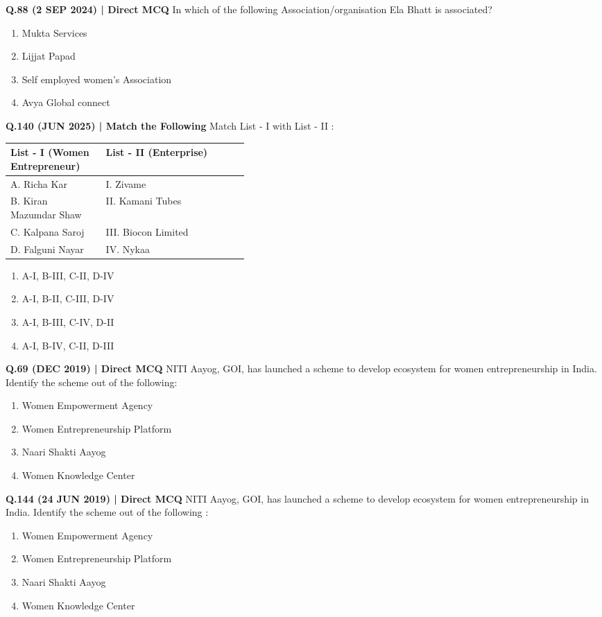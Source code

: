 \documentclass{article}
\begin{document}
\textbf{Q.88 (2 SEP 2024) | Direct MCQ}
In which of the following Association/organisation Ela Bhatt is associated?
\begin{enumerate}[label=(\arabic*)]
    \item Mukta Services
    \item Lijjat Papad
    \item Self employed women's Association
    \item Avya Global connect
\end{enumerate}

\textbf{Q.140 (JUN 2025) | Match the Following}
Match List - I with List - II :
\begin{tabularx}{\linewidth}{@{} p{0.4\linewidth} X @{}}
    \toprule
    \textbf{List - I (Women Entrepreneur)} & \textbf{List - II (Enterprise)} \\
    \midrule
    A. Richa Kar & I. Zivame \\
    B. Kiran Mazumdar Shaw & II. Kamani Tubes \\
    C. Kalpana Saroj & III. Biocon Limited \\
    D. Falguni Nayar & IV. Nykaa \\
    \bottomrule
\end{tabularx}
\begin{enumerate}[label=(\arabic*)]
    \item A-I, B-III, C-II, D-IV
    \item A-I, B-II, C-III, D-IV
    \item A-I, B-III, C-IV, D-II
    \item A-I, B-IV, C-II, D-III
\end{enumerate}

\textbf{Q.69 (DEC 2019) | Direct MCQ}
NITI Aayog, GOI, has launched a scheme to develop ecosystem for women entrepreneurship in India. Identify the scheme out of the following:
\begin{enumerate}[label=(\arabic*)]
    \item Women Empowerment Agency
    \item Women Entrepreneurship Platform
    \item Naari Shakti Aayog
    \item Women Knowledge Center
\end{enumerate}

\textbf{Q.144 (24 JUN 2019) | Direct MCQ}
NITI Aayog, GOI, has launched a scheme to develop ecosystem for women entrepreneurship in India. Identify the scheme out of the following :
\begin{enumerate}[label=(\arabic*)]
    \item Women Empowerment Agency
    \item Women Entrepreneurship Platform
    \item Naari Shakti Aayog
    \item Women Knowledge Center
\end{enumerate}
\end{document}
